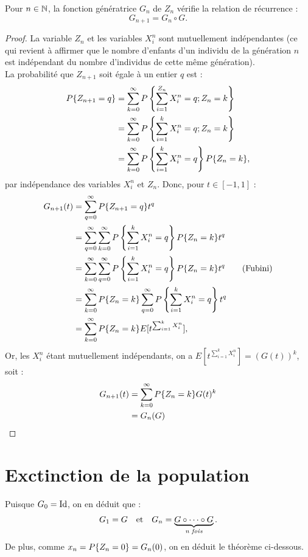 \begin{thm}
Pour $n \in \mathbb{N}$, la fonction génératrice $G_n$ de $Z_n$ vérifie la relation de récurrence :
\[ G_{n+1} = G_n \circ G . \]
\end{thm}

\begin{proof}
La variable $Z_n$ et les variables $X_i^n$ sont mutuellement indépendantes (ce qui revient à affirmer que le nombre d'enfants d'un
individu de la génération $n$ est indépendant du nombre d'individus de cette même génération). \\
La probabilité que $Z_{n+1}$ soit égale à un entier $q$ est :
\begin{align*}
P\{ Z_{n+1} = q \} & = \sum_{k=0}^{\infty} P \left \{ \sum_{i=1}^{Z_n} X_i^n = q ; Z_n = k \right \} \\
& = \sum_{k=0}^{\infty} P\left \{ \sum_{i=1}^k X_i^n = q ; Z_n = k \right \} \\
& = \sum_{k=0}^{\infty} P\left \{ \sum_{i=1}^k X_i^n = q \right \} P\{ Z_n=k \},
\end{align*}
par indépendance des variables $X_i^n$ et $Z_n$. Donc, pour $t \in [-1, 1]$ :
\begin{align*}
G_{n+1}(t) & = \sum_{q=0}^{\infty} P \{ Z_{n+1} = q \} t^q \\
& = \sum_{q=0}^{\infty} \sum_{k=0}^{\infty} P\left \{ \sum_{i=1}^k X_i^n = q \right \} P\{ Z_n=k \} t^q \\
& = \sum_{k=0}^{\infty} \sum_{q=0}^{\infty} P\left \{ \sum_{i=1}^k X_i^n = q \right \} P\{ Z_n=k \} t^q \qquad \text{(Fubini)} \\
& = \sum_{k=0}^{\infty} P\{ Z_n=k \} \sum_{q=0}^{\infty} P\left \{ \sum_{i=1}^k X_i^n = q \right \} t^q \\
& = \sum_{k=0}^{\infty} P\{ Z_n=k \} E[t^{\sum_{i=1}^k X_i^n}] ,
\end{align*}
Or, les $X_i^n$ étant mutuellement indépendants, on a $E[t^{\sum_{i=1}^k X_i^n}] = (G(t))^k$, soit :
\begin{align*}
G_{n+1}(t) & = \sum_{k=0}^{\infty} P\{ Z_n=k \} G(t)^k \\
& = G_n(G)
\end{align*}
\end{proof}

\section{Exctinction de la population}

Puisque $G_0=\operatorname{Id}$, on en déduit que :
\[ G_1 = G \quad \text{et} \quad G_n = \underbrace{G \circ \cdots \circ G}_{\textit{n fois}} . \]
De plus, comme $x_n = P \{ Z_n=0 \} = G_n(0)$, on en déduit le théorème ci-dessous.

